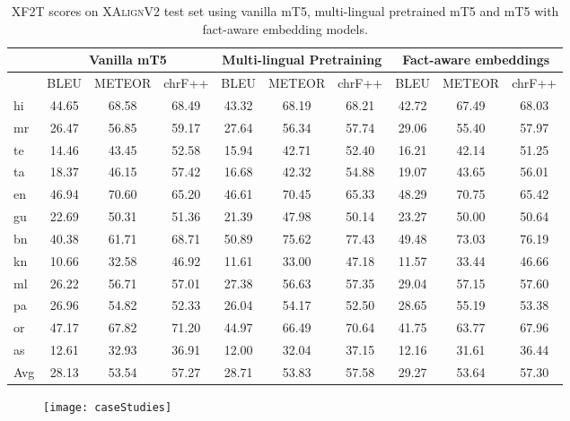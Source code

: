 \documentclass[runningheads]{llncs}
\newcommand{\data}{\textsc{XAlignV2}}
\begin{document}
\begin{table*}
    \centering
    \scriptsize
    \begin{tabular}{|l||c|c|c||c|c|c||c|c|c|}
\hline
&\multicolumn{3}{c||}{Vanilla mT5}&\multicolumn{3}{c||}{Multi-lingual Pretraining}&\multicolumn{3}{c|}{Fact-aware embeddings}\\
\hline
&BLEU&METEOR&chrF++&BLEU&METEOR&chrF++&BLEU&METEOR&chrF++\\
\hline
hi&44.65&68.58&68.49&43.32&68.19&68.21&42.72&67.49&68.03\\
\hline
mr&26.47&56.85&59.17&27.64&56.34&57.74&29.06&55.40&57.97\\
\hline
te&14.46&43.45&52.58&15.94&42.71&52.40&16.21&42.14&51.25\\
\hline
ta&18.37&46.15&57.42&16.68&42.32&54.88&19.07&43.65&56.01\\
\hline
en&46.94&70.60&65.20&46.61&70.45&65.33&48.29&70.75&65.42\\
\hline
gu&22.69&50.31&51.36&21.39&47.98&50.14&23.27&50.00&50.64\\
\hline
bn&40.38&61.71&68.71&50.89&75.62&77.43&49.48&73.03&76.19\\
\hline
kn&10.66&32.58&46.92&11.61&33.00&47.18&11.57&33.44&46.66\\
\hline
ml&26.22&56.71&57.01&27.38&56.63&57.35&29.04&57.15&57.60\\
\hline
pa&26.96&54.82&52.33&26.04&54.17&52.50&28.65&55.19&53.38\\
\hline
or&47.17&67.82&71.20&44.97&66.49&70.64&41.75&63.77&67.96\\
\hline
as&12.61&32.93&36.91&12.00&32.04&37.15&12.16&31.61&36.44\\
\hline
Avg&28.13&53.54&57.27&28.71&53.83&57.58&29.27&53.64&57.30\\
\hline
    \end{tabular}
    \caption{XF2T scores on \data{} test set using vanilla mT5, multi-lingual pretrained mT5 and mT5 with fact-aware embedding models.}
    \label{tab:comparison}
\end{table*}












\begin{figure*}
    \centering
    \texttt{[image: caseStudies]}
    \label{tab:caseStudies}
\end{figure*}
\end{document}
